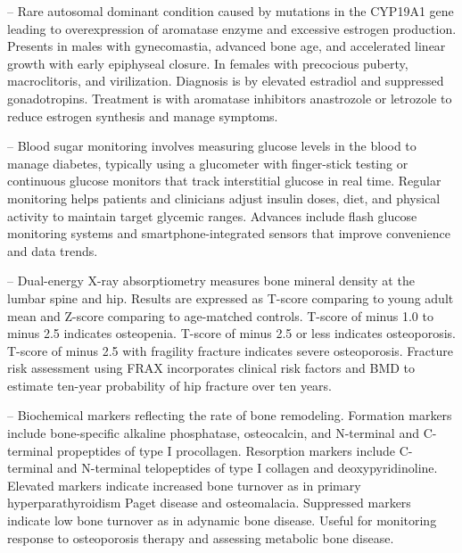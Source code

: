 -- Rare autosomal dominant condition caused by mutations in the CYP19A1 gene leading to overexpression of aromatase enzyme and excessive estrogen production. Presents in males with gynecomastia, advanced bone age, and accelerated linear growth with early epiphyseal closure. In females with precocious puberty, macroclitoris, and virilization. Diagnosis is by elevated estradiol and suppressed gonadotropins. Treatment is with aromatase inhibitors anastrozole or letrozole to reduce estrogen synthesis and manage symptoms.

-- Blood sugar monitoring involves measuring glucose levels in the blood to manage diabetes, typically using a glucometer with finger-stick testing or continuous glucose monitors that track interstitial glucose in real time. Regular monitoring helps patients and clinicians adjust insulin doses, diet, and physical activity to maintain target glycemic ranges. Advances include flash glucose monitoring systems and smartphone-integrated sensors that improve convenience and data trends.

-- Dual-energy X-ray absorptiometry measures bone mineral density at the lumbar spine and hip. Results are expressed as T-score comparing to young adult mean and Z-score comparing to age-matched controls. T-score of minus 1.0 to minus 2.5 indicates osteopenia. T-score of minus 2.5 or less indicates osteoporosis. T-score of minus 2.5 with fragility fracture indicates severe osteoporosis. Fracture risk assessment using FRAX incorporates clinical risk factors and BMD to estimate ten-year probability of hip fracture over ten years.

-- Biochemical markers reflecting the rate of bone remodeling. Formation markers include bone-specific alkaline phosphatase, osteocalcin, and N-terminal and C-terminal propeptides of type I procollagen. Resorption markers include C-terminal and N-terminal telopeptides of type I collagen and deoxypyridinoline. Elevated markers indicate increased bone turnover as in primary hyperparathyroidism Paget disease and osteomalacia. Suppressed markers indicate low bone turnover as in adynamic bone disease. Useful for monitoring response to osteoporosis therapy and assessing metabolic bone disease.

